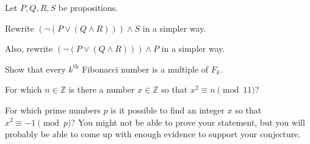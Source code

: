 \documentclass[12pt]{midterm}
\begin{document}
\begin{exam}
\begin{problem}[350]
  Let $P, Q, R, S$ be propositions.

Rewrite $(\neg (P \vee (Q \wedge
  R))) \wedge S$ in a simpler way.

Also, rewrite $(\neg (P \vee (Q \wedge
  R))) \wedge P$ in a simpler way.
\end{problem}

\begin{solution}\begin{solutiontext}
\end{solutiontext}\end{solution}

\begin{problem}[350]
Show that every $k^{\mbox{th}}$ Fibonacci number is a multiple of $F_k$.
\end{problem}

\begin{solution}\begin{solutiontext}
\end{solutiontext}\end{solution}

\begin{problem}[350]
For which $n \in \mathbb{Z}$ is there a number $x \in \mathbb{Z}$ so
that $x^2 \equiv n \pmod 11$?
\end{problem}

\begin{solution}\begin{solutiontext}
\end{solutiontext}\end{solution}

\begin{problem}[350]
For which prime numbers $p$ is it possible to find an integer $x$ so
that $x^2 \equiv -1 \pmod p$?  You might not be able to prove your
statement, but you will probably be able to come up with enough
evidence to support your conjecture.
\end{problem}

\begin{solution}\begin{solutiontext}
\end{solutiontext}\end{solution}


\end{exam}
\end{document}
